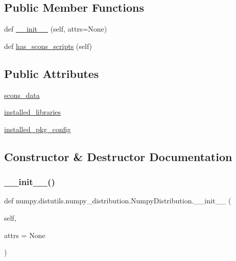 \subsection*{Public Member Functions}
\begin{DoxyCompactItemize}
\item 
def \hyperlink{classnumpy_1_1distutils_1_1numpy__distribution_1_1NumpyDistribution_ae4540d105fc129fc7925900026fa7902}{\+\_\+\+\_\+init\+\_\+\+\_\+} (self, attrs=None)
\item 
def \hyperlink{classnumpy_1_1distutils_1_1numpy__distribution_1_1NumpyDistribution_a3564982c1e37097f0430fc1efee14313}{has\+\_\+scons\+\_\+scripts} (self)
\end{DoxyCompactItemize}
\subsection*{Public Attributes}
\begin{DoxyCompactItemize}
\item 
\hyperlink{classnumpy_1_1distutils_1_1numpy__distribution_1_1NumpyDistribution_a0f7352e4cb493a1fb5b3baa85b32cb8b}{scons\+\_\+data}
\item 
\hyperlink{classnumpy_1_1distutils_1_1numpy__distribution_1_1NumpyDistribution_ab3aedd5339f0ed77e823a255b41c66e0}{installed\+\_\+libraries}
\item 
\hyperlink{classnumpy_1_1distutils_1_1numpy__distribution_1_1NumpyDistribution_a8feb72d5368a9c04186175eb84f8a5b5}{installed\+\_\+pkg\+\_\+config}
\end{DoxyCompactItemize}


\subsection{Constructor \& Destructor Documentation}
\mbox{\label{classnumpy_1_1distutils_1_1numpy__distribution_1_1NumpyDistribution_ae4540d105fc129fc7925900026fa7902}} 
\subsubsection{\texorpdfstring{\+\_\+\+\_\+init\+\_\+\+\_\+()}{\_\_init\_\_()}}
{\footnotesize\ttfamily def numpy.\+distutils.\+numpy\+\_\+distribution.\+Numpy\+Distribution.\+\_\+\+\_\+init\+\_\+\+\_\+ (\begin{DoxyParamCaption}\item[{}]{self,  }\item[{}]{attrs = {\ttfamily None} }\end{DoxyParamCaption})}



